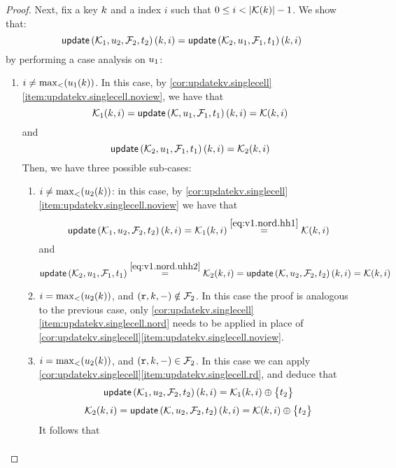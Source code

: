 \begin{proof}
Next, fix a key $k$ and a index $i$ such that $0 \leq i < \lvert  \mathcal{K}(k)  \rvert - 1$. 
We show that:
\[ 
    \updateKV[\mkvs_1,\vi_2,\fp_2,\txid_2](\key, i) = \updateKV[\mkvs_2, \vi_1, \fp_1, \txid_1](\key, i)
\]
by performing a case analysis on $u_1$: 
\begin{enumerate}
    \item $i \neq \max_{<}(u_1(k))$. 
In this case, by \cref{cor:updatekv.singlecell}\cref{item:updatekv.singlecell.noview}, 
we have that 
\begin{equation}
\mkvs_1(\key, i) = \updateKV[\mkvs, \vi_1, \fp_1, \txid_1](\key, i) = \mkvs(\key, i)
\label{eq:v1.nord.hh1}
\end{equation}
and 
\begin{equation}
\updateKV[\mkvs_2, \vi_1, \fp_1, \txid_1](\key, i) = \mkvs_2(\key, i)
\label{eq:v1.nord.uhh2}
\end{equation}
Then, we have three possible sub-cases: 
\begin{enumerate}
    \item $i \neq \max_{<}(u_2(k))$: in this case, by \cref{cor:updatekv.singlecell}\cref{item:updatekv.singlecell.noview} we have that 
\[
\updateKV[\mkvs_1, \vi_2, \fp_2, \txid_2](\key, i) = 
\mkvs_1(\key, i) \stackrel{\cref{eq:v1.nord.hh1}}{=} \mkvs(\key, i)
\]
and
\[
\updateKV[\mkvs_2, \vi_1, \fp_1, \txid_1] \stackrel{\cref{eq:v1.nord.uhh2}}{=} \mkvs_2(\key,i) = 
\updateKV[\mkvs, \vi_2, \fp_2, \txid_2](\key, i) = \mkvs(\key, i)
\]
\item $i = \max_{<}(u_2(k))$, and $(\textnormal{\texttt r}, k, -) \notin \mathcal{F}_2$. In this case the proof is analogous to the previous case, 
only \cref{cor:updatekv.singlecell}\cref{item:updatekv.singlecell.nord} needs to be applied in place 
of \cref{cor:updatekv.singlecell}\cref{item:updatekv.singlecell.noview}.
\item $i = \max_{<}(u_2(k))$, and $(\textnormal{\texttt r}, k, -) \in \mathcal{F}_2$. In this case we can apply \cref{cor:updatekv.singlecell}\cref{item:updatekv.singlecell.rd}, 
and deduce that 
\begin{equation}
\updateKV[\mkvs_1, \vi_2, \fp_2, \txid_2](\key, i) = \mkvs_1(\key, i) \oplus \Set{\txid_2}
\label{eq:v1.nord.v2.rd.uhh1}
\end{equation}
\begin{equation}
\mkvs_2(\key, i) = \updateKV[\mkvs, \vi_2, \fp_2, \txid_2](\key, i) = \mkvs(\key,i) \oplus \Set{\txid_2}
\label{eq:v1.nord.v2.rd.hh2}
\end{equation}
It follows that 
\[
\begin{array}{l}

\end{array}\]
\end{enumerate}
\end{enumerate}
\end{proof}
